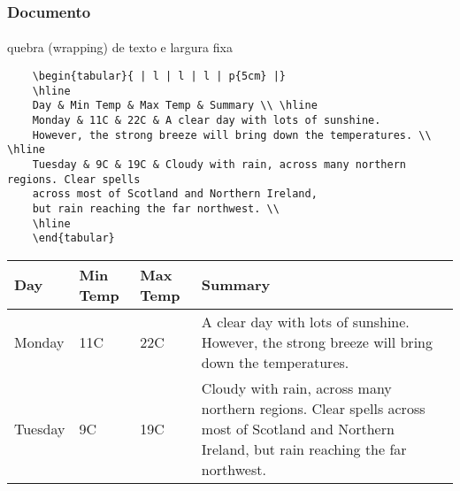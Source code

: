 \begin{frame}[fragile]
\frametitle{Documento}
\framesubtitle{}
  \scriptsize
  quebra (wrapping) de texto e largura fixa
  \vspace{-0.2cm}
  \scriptsize
  \begin{verbatim}
    \begin{tabular}{ | l | l | l | p{5cm} |}
    \hline
    Day & Min Temp & Max Temp & Summary \\ \hline
    Monday & 11C & 22C & A clear day with lots of sunshine.  
    However, the strong breeze will bring down the temperatures. \\ \hline
    Tuesday & 9C & 19C & Cloudy with rain, across many northern regions. Clear spells
    across most of Scotland and Northern Ireland,
    but rain reaching the far northwest. \\
    \hline
    \end{tabular}
  \end{verbatim}
  \vspace{-0.2cm}
  \begin{fmpage}{\textwidth}
    \begin{tabular}{ | l | l | l | p{5cm} |}
    \hline
    Day & Min Temp & Max Temp & Summary \\ \hline
    Monday & 11C & 22C & A clear day with lots of sunshine.
    However, the strong breeze will bring down the temperatures. \\ \hline
    Tuesday & 9C & 19C & Cloudy with rain, across many northern regions. Clear spells
    across most of Scotland and Northern Ireland,
    but rain reaching the far northwest. \\
    \hline
    \end{tabular}
  \end{fmpage}
\end{frame}


